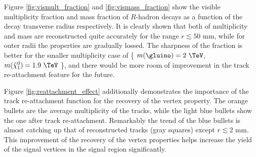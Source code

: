 Figure \ref{fig:vismult_fraction} and \ref{fig:vismass_fraction} show the visible multiplicity fraction and mass fraction of $R$-hadron decays as a function of the decay transverse radius respectively. It is clearly shown that both of multiplicity and mass are reconstructed quite accurately for the range $r\lesssim 50$ mm, while for outer radii the properties are gradually lossed. The sharpness of the fraction is better for the smaller multiplicity case of \{ $m(\gluino) = 2~\TeV$, $m(\tilde{\chi}_{1}^{0}) = 1.9~\TeV$ \}, and there would be more room of improvement in the track re-attachment feature for the future.

Figure \ref{fig:reattachment_effect} additionally demonstrates the importance of the track re-attachment function for the recovery of the vertex property. The orange bullets are the average multiplicity of the tracks, while the light blue bullets show the one after track re-attachment. Remarkably the trend of the blue bullets is almost catching up that of reconstructed tracks (gray squares) except $r\lesssim 2$ mm. This improvement of the recovery of the vertex properties helps increase the yield of the signal vertices in the signal region significantly.

